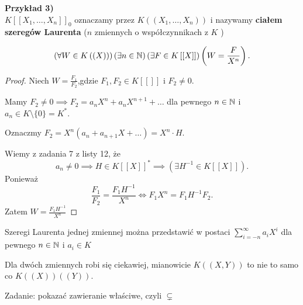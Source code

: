 \noindent \textbf{Przykład 3)}\\
$K\left[ \left[ X_1,\ldots,X_{n}  \right]  \right]_{0}$ oznaczamy przez $K\left( \left( X_1,\ldots,X_{n}  \right)  \right) $ i nazywamy \textbf{ciałem szeregów Laurenta} ($n$ zmiennych o współczynnikach z $K$ ) 

\begin{fact}
	\[
	\left(\forall W \in K\left( \left( X \right)  \right)  \right)\left(\exists n \in \mathbb{N} \right)\left(\exists F \in K\left[ \left[ X \right]  \right]  \right)\left( W = \frac{F}{X^{n}} \right)    
	.\] 
\end{fact}

\begin{proof}
	Niech $W = \frac{F_1}{F_2}$,gdzie $F_1,F_2 \in K\left[ \left[  \right]  \right] $ i  $F_2\neq 0$.

	Mamy $F_2 \neq 0 \implies F_2 = a_{n} X^{n} + a_{n} X^{n+1} + \ldots$ dla pewnego $n \in \mathbb{N}$ i $a_{n} \in K\setminus \{0\} = K^{\ast} $.

	Oznaczmy $F_2 = X^{n}\left( a_{n} + a_{n+1}X + \ldots \right) = X^{n}\cdot H$.

	Wiemy z zadania 7 z listy 12, że 
	\[
	a_{n} \neq 0 \implies H \in K\left[ \left[ X \right]  \right]^{\ast} \implies \left(\exists H^{-1} \in K\left[ \left[ X \right]  \right] \right) 
	.\] 
	Ponieważ
	\[
	\frac{F_1}{F_2} = \frac{F_1H^{-1}}{X^{n}} \iff F_1X^{n} = F_1H^{-1}F_2
	.\]
	Zatem $W = \frac{F_1H^{-1}}{X^{n}}$
\end{proof} 
\begin{corollary}

	Szeregi Laurenta jednej zmiennej można przedstawić w postaci $\sum_{i= -n}^{\infty} a_{i}X^{i}$ dla pewnego $n\in \mathbb{N}$ i $a_{i} \in K$
\end{corollary}

\begin{remark}
	Dla dwóch zmiennych robi się ciekawiej, mianowicie
	$K\left( \left( X,Y \right)  \right) $ to nie to samo co $K\left( \left( X \right)  \right) \left( \left( Y \right)  \right)$.

	Zadanie: pokazać zawieranie właściwe, czyli $\subsetneq $
\end{remark} 

